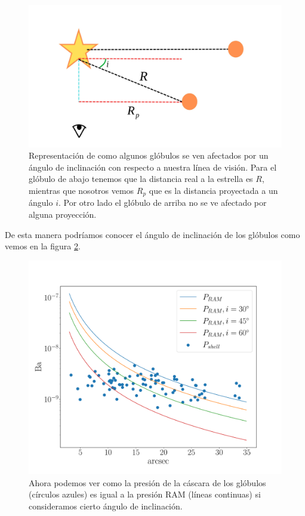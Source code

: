 \documentclass{book}
\begin{document}
\begin{figure}[h]
    \centering
    \includegraphics[width=\textwidth]{artesanales/ImgFi01-6.pdf}
    \caption{Representación de como algunos glóbulos se ven afectados por un ángulo de inclinación con respecto a nuestra línea de visión. Para el glóbulo de abajo tenemos que la distancia real a la estrella es $R$, mientras que nosotros vemos $R_p$ que es la distancia proyectada a un ángulo $i$. Por otro lado el glóbulo de arriba no se ve afectado por alguna proyección.}
    \label{Ang proyeccion}
\end{figure}

De esta manera podríamos conocer el ángulo de inclinación de los glóbulos como vemos en la figura \ref{graf_presion_ang}.

\begin{figure}[h]
    \centering
    \includegraphics[width=\textwidth]{imagenes Chapter 4/Presiones_ang.pdf}
    \caption{Ahora podemos ver como la presión de la cáscara de los glóbulos (círculos azules) es igual a la presión RAM (líneas continuas) si consideramos cierto ángulo de inclinación.}
    \label{graf_presion_ang}
\end{figure}
\end{document}
